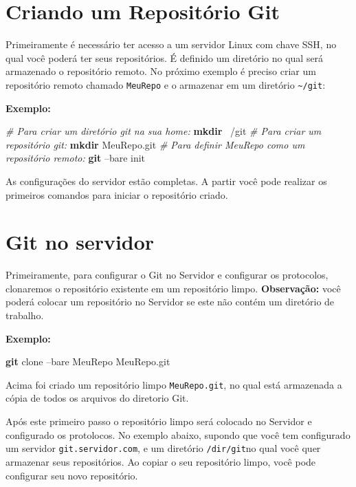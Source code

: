 \documentclass[
  a5paper,
  pagesize,
  9pt,
  pointlessnumbers,
  normalheadings,
  twoside=false
]{book}
\newenvironment{Shaded}{\begin{snugshade}}{\end{snugshade}}
\newcommand{\KeywordTok}[1]{\textcolor[rgb]{0.13,0.29,0.53}{\textbf{{#1}}}}
\newcommand{\CommentTok}[1]{\textcolor[rgb]{0.56,0.35,0.01}{\textit{{#1}}}}
\newcommand{\NormalTok}[1]{{#1}}
\begin{document}
\section{Criando um Repositório Git}\label{criando-um-repositorio-git}

Primeiramente é necessário ter acesso a um servidor Linux com chave SSH,
no qual você poderá ter seus repositórios. É definido um diretório no
qual será armazenado o repositório remoto. No próximo exemplo é preciso
criar um repositório remoto chamado \texttt{MeuRepo} e o armazenar em um
diretório \texttt{\textasciitilde{}/git}:

\textbf{Exemplo:}

\begin{Shaded}
\begin{Highlighting}[]
\CommentTok{# Para criar um diretório git na sua home:}
\KeywordTok{mkdir} \NormalTok{~/git}
\CommentTok{# Para criar um repositório git:}
\KeywordTok{mkdir} \NormalTok{MeuRepo.git}
\CommentTok{# Para definir MeuRepo como um repositório remoto:}
\KeywordTok{git} \NormalTok{--bare init}
\end{Highlighting}
\end{Shaded}

As configurações do servidor estão completas. A partir você pode
realizar os primeiros comandos para iniciar o repositório criado.

\section{Git no servidor}\label{git-no-servidor}

Primeiramente, para configurar o Git no Servidor e configurar os
protocolos, clonaremos o repositório existente em um repositório limpo.
\textbf{Observação:} você poderá colocar um repositório no Servidor se
este não contém um diretório de trabalho.

\textbf{Exemplo:}

\begin{Shaded}
\begin{Highlighting}[]
 \KeywordTok{git} \NormalTok{clone --bare MeuRepo MeuRepo.git}
\end{Highlighting}
\end{Shaded}

Acima foi criado um repositório limpo \texttt{MeuRepo.git}, no qual está
armazenada a cópia de todos os arquivos do diretorio Git.

Após este primeiro passo o repositório limpo será colocado no Servidor e
configurado os protolocos. No exemplo abaixo, supondo que você tem
configurado um servidor \texttt{git.servidor.com}, e um diretório
\texttt{/dir/git}no qual você quer armazenar seus repositórios. Ao
copiar o seu repositório limpo, você pode configurar seu novo
repositório.
\end{document}
